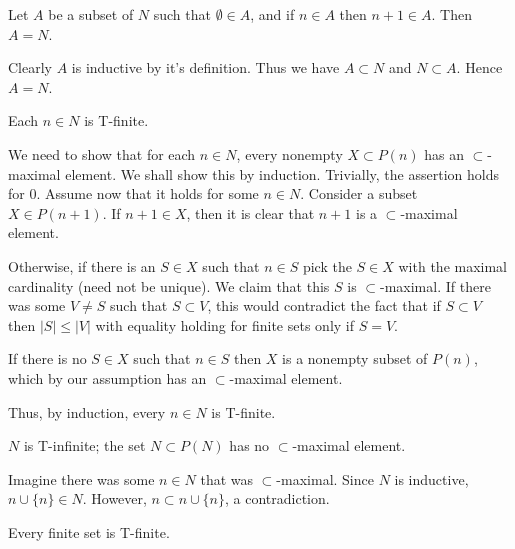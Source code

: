 \setcounter{problem}{8}
\begin{problem}[Induction]
  Let $A$ be a subset of $N$ such that $\emptyset \in A$, and if $n \in A$ then $n + 1 \in A$.
  Then $A = N$.
\end{problem}

\begin{solution}
  Clearly $A$ is inductive by it's definition.
  Thus we have $A \subset N$ and $N \subset A$.
  Hence $A = N$.
\end{solution}

\begin{problem}
  Each $n \in N$ is T-finite.
\end{problem}

\begin{solution}
  We need to show that for each $n \in N$, every nonempty $X \subset P(n)$ has an $\subset$-maximal element.
  We shall show this by induction.
  Trivially, the assertion holds for $0$.
  Assume now that it holds for some $n \in N$.
  Consider a subset $X \in P(n + 1)$.
  If $n + 1 \in X$, then it is clear that $n + 1$ is a $\subset$-maximal element.

  Otherwise, if there is an $S \in X$ such that $n \in S$ pick the $S \in X$ with the maximal cardinality (need not be unique).
  We claim that this $S$ is $\subset$-maximal.
  If there was some $V \neq S$ such that $S \subset V$, this would contradict the fact that if $S \subset V$ then $|S| \le |V|$ with equality holding for finite sets only if $S = V$.

  If there is no $S \in X$ such that $n \in S$ then $X$ is a nonempty subset of $P(n)$, which by our assumption has an $\subset$-maximal element.

  Thus, by induction, every $n \in N$ is T-finite.
\end{solution}

\begin{problem}
  $N$ is T-infinite; the set $N \subset P(N)$ has no $\subset$-maximal element.
\end{problem}

\begin{solution}
  Imagine there was some $n \in N$ that was $\subset$-maximal.
  Since $N$ is inductive, $n \cup \{n\} \in N$.
  However, $n \subset n \cup \{n\}$, a contradiction.
\end{solution}

\begin{problem}
  Every finite set is T-finite.
\end{problem}

